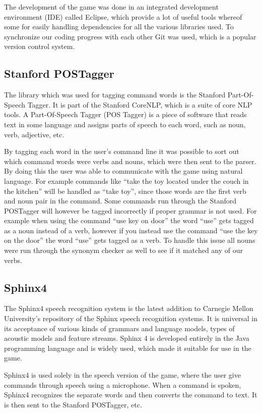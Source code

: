 The development of the game was done in an integrated development environment (IDE) called Eclipse, which provide a lot of useful tools whereof some for easily handling dependencies for all the various libraries used. To synchronize our coding progress with each other Git was used, which is a popular version control system.

\subsection{Stanford POSTagger} \label{sec:postagger}
The library which was used for tagging command words is the Stanford Part-Of-Speech Tagger. It is part of the Stanford CoreNLP, which is a suite of core NLP tools. A Part-Of-Speech Tagger (POS Tagger) is a piece of software that reads text in some language and assigns parts of speech to each word, such as noun, verb, adjective, etc. \citep{POSTagger}

By tagging each word in the user's command line it was possible to sort out which command words were verbs and nouns, which were then sent to the parser. By doing this the user was able to communicate with the game using natural language. For example commands like ``take the toy located under the couch in the kitchen'' will be handled as ``take toy'', since those words are the first verb and noun pair in the command. Some commands run through the Stanford POSTagger will however be tagged incorrectly if proper grammar is not used. For example when using the command ``use key on door'' the word ``use'' gets tagged as a noun instead of a verb, however if you instead use the command ``use the key on the door'' the word ``use'' gets tagged as a verb. To handle this issue all nouns were run through the synonym checker as well to see if it matched any of our verbs.

\subsection{Sphinx4} \label{sec:sphinx4}
The Sphinx4 speech recognition system is the latest addition to Carnegie Mellon University's repository of the Sphinx speech recognition systems. It is universal in its acceptance of various kinds of grammars and language models, types of acoustic models and feature streams. Sphinx 4 is developed entirely in the Java programming language and is widely used, which made it suitable for use in the game. \citep{Sphinx4}

Sphinx4 is used solely in the speech version of the game, where the user give commands through speech using a microphone. When a command is spoken, Sphinx4 recognizes the separate words and then converts the command to text. It is then sent to the Stanford POSTagger, etc.

